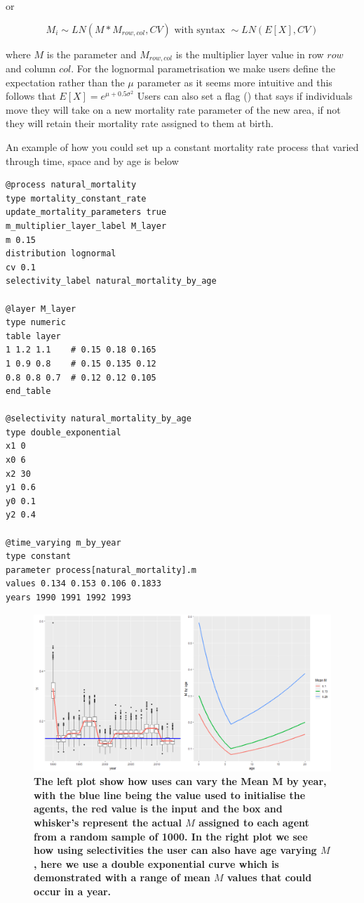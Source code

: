 or 

\begin{equation}\label{constan_mort_assign_ln}
M_i \sim LN(M * M_{row,col}, CV) \text{ with syntax } \sim LN(E[X],CV)
\end{equation}

where $M$ is the parameter  and $M_{row,col}$ is the multiplier layer value in row $row$ and column $col$. For the lognormal parametrisation we make users define the expectation rather than the $\mu$ parameter as it seems more intuitive and this follows that $E[X] = e^{\mu + 0.5\sigma^2}$ Users can also set a flag () that says if individuals move they will take on a new mortality rate parameter of the new area, if not they will retain their mortality rate assigned to them at birth.

An example of how you could set up a constant mortality rate process that varied through time, space and by age is below

{\small{\begin{verbatim}
@process natural_mortality
type mortality_constant_rate
update_mortality_parameters true
m_multiplier_layer_label M_layer
m 0.15
distribution lognormal
cv 0.1
selectivity_label natural_mortality_by_age

@layer M_layer
type numeric
table layer
1 1.2 1.1    # 0.15 0.18 0.165
1 0.9 0.8    # 0.15 0.135 0.12
0.8 0.8 0.7  # 0.12 0.12 0.105
end_table

@selectivity natural_mortality_by_age
type double_exponential
x1 0
x0 6
x2 30
y1 0.6
y0 0.1
y2 0.4

@time_varying m_by_year
type constant
parameter process[natural_mortality].m
values 0.134 0.153 0.106 0.1833
years 1990 1991 1992 1993 
\end{verbatim}}}

\begin{figure}[h!]
	\centering
	\includegraphics[scale=0.45]{Figures/Time_age_varying_M.png}
	\caption{\textbf{The left plot show how uses can vary the Mean M by year, with the blue line being the value used to initialise the agents, the red value is the input and the box and whisker's represent the actual $M$ assigned to each agent from a random sample of 1000. In the right plot we see how using selectivities the user can also have age varying $M$, here we use a double exponential curve which is demonstrated with a range of mean $M$ values that could occur in a year.}}
	\label{fig:varying_M}
\end{figure}


